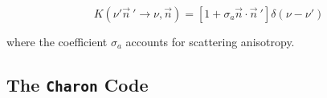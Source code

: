 \documentclass[11pt,a4paper,headinclude=true,DIV=14,BCOR=8mm,chapterprefix,listof=totoc,twoside,openright,abstracton]{scrbook}
\begin{document}
\begin{equation}
    K(\nu'\vec{n}\: '\rightarrow\nu,\vec{n}) = [1 + \sigma_a\vec{n}\cdot\vec{n}\: ']\delta(\nu-\nu')
\end{equation}

where the coefficient $\sigma_a$ accounts for scattering anisotropy. 

\subsection{The \texttt{Charon} Code}


\end{document}
